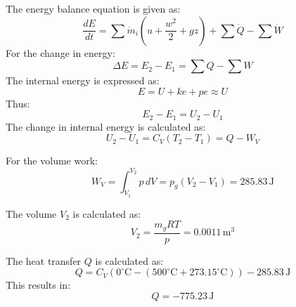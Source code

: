 The energy balance equation is given as:  
\[
\frac{dE}{dt} = \sum \dot{m}_i (u + \frac{w^2}{2} + gz) + \sum \dot{Q} - \sum \dot{W}
\]  
For the change in energy:  
\[
\Delta E = E_2 - E_1 = \sum Q - \sum W
\]  
The internal energy is expressed as:  
\[
E = U + ke + pe \approx U
\]  
Thus:  
\[
E_2 - E_1 = U_2 - U_1
\]  
The change in internal energy is calculated as:  
\[
U_2 - U_1 = C_V (T_2 - T_1) = Q - W_V
\]  

For the volume work:  
\[
W_V = \int_{V_1}^{V_2} p \, dV = p_g (V_2 - V_1) = 285.83 \, \text{J}
\]  

The volume \( V_2 \) is calculated as:  
\[
V_2 = \frac{m_g R T}{p} = 0.0011 \, \text{m}^3
\]  

The heat transfer \( Q \) is calculated as:  
\[
Q = C_V (0^\circ\text{C} - (500^\circ\text{C} + 273.15^\circ\text{C})) - 285.83 \, \text{J}
\]  
This results in:  
\[
Q = -775.23 \, \text{J}
\]